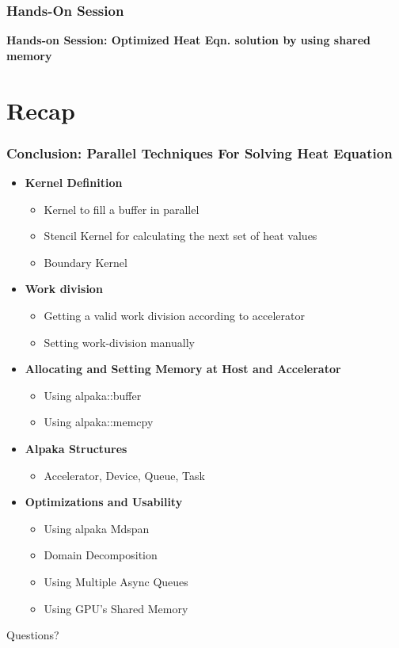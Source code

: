 \documentclass[9pt]{beamer}
\begin{document}
\begin{frame}
\frametitle{Hands-On Session}
\begin{center}
      \Huge \textbf{Hands-on Session: Optimized Heat Eqn. solution by using shared memory}
  \end{center}
\end{frame}


\section{Recap}

\begin{frame}
\frametitle{Conclusion: Parallel Techniques For Solving Heat Equation}
\begin{itemize}
    \item \textbf{Kernel Definition}
    \begin{itemize}
        \item Kernel to fill a buffer in parallel
        \item Stencil Kernel for calculating the next set of heat values
        \item Boundary Kernel
    \end{itemize}
    \item \textbf{Work division}
    \begin{itemize}
        \item Getting a valid work division according to accelerator
        \item Setting work-division manually
    \end{itemize}
    \item \textbf{Allocating and Setting Memory at Host and Accelerator }
    \begin{itemize}
        \item Using alpaka::buffer
        \item Using alpaka::memcpy
    \end{itemize}
    \item \textbf{Alpaka Structures}
    \begin{itemize}
        \item Accelerator, Device, Queue, Task
    \end{itemize}
    \item \textbf{Optimizations and Usability}
    \begin{itemize}
        \item Using alpaka Mdspan
        \item Domain Decomposition
        \item Using Multiple Async Queues
        \item Using GPU's Shared Memory
    \end{itemize}
\end{itemize}
\end{frame}


\begin{frame}
\Huge{\centerline{Questions?}}
\end{frame}

\end{document}
